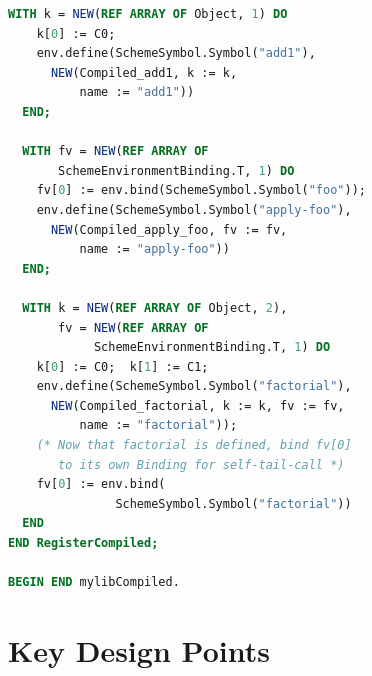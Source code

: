 \documentclass[12pt]{report}
\begin{document}
\begin{lstlisting}[language=Modula3]
  WITH k = NEW(REF ARRAY OF Object, 1) DO
    k[0] := C0;
    env.define(SchemeSymbol.Symbol("add1"),
      NEW(Compiled_add1, k := k,
          name := "add1"))
  END;

  WITH fv = NEW(REF ARRAY OF
       SchemeEnvironmentBinding.T, 1) DO
    fv[0] := env.bind(SchemeSymbol.Symbol("foo"));
    env.define(SchemeSymbol.Symbol("apply-foo"),
      NEW(Compiled_apply_foo, fv := fv,
          name := "apply-foo"))
  END;

  WITH k = NEW(REF ARRAY OF Object, 2),
       fv = NEW(REF ARRAY OF
            SchemeEnvironmentBinding.T, 1) DO
    k[0] := C0;  k[1] := C1;
    env.define(SchemeSymbol.Symbol("factorial"),
      NEW(Compiled_factorial, k := k, fv := fv,
          name := "factorial"));
    (* Now that factorial is defined, bind fv[0]
       to its own Binding for self-tail-call *)
    fv[0] := env.bind(
               SchemeSymbol.Symbol("factorial"))
  END
END RegisterCompiled;

BEGIN END mylibCompiled.
\end{lstlisting}

\section{Key Design Points}
\end{document}
